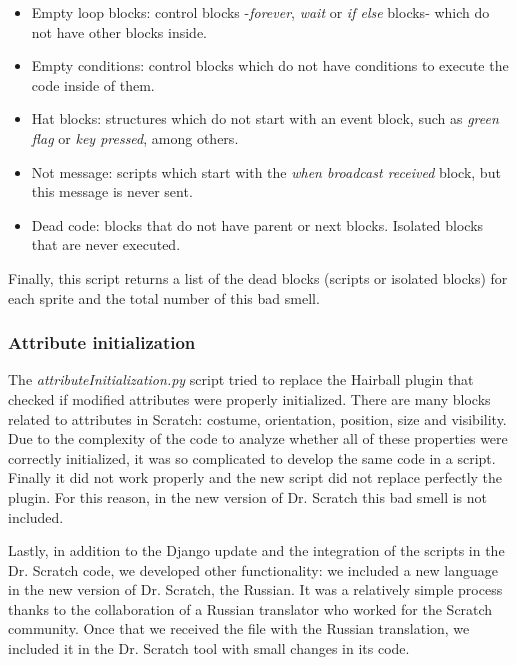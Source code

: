 \begin{itemize}
    \item Empty loop blocks: control blocks -\textit{forever}, \textit{wait} or \textit{if else} blocks- which do not have other blocks inside. 
    \item Empty conditions: control blocks which do not have conditions to execute the code inside of them.
    \item Hat blocks: structures which do not start with an event block, such as \textit{green flag} or \textit{key pressed}, among others.
    \item Not message: scripts which start with the \textit{when broadcast received} block, but this message is never sent. 
    \item Dead code: blocks that do not have parent or next blocks. Isolated blocks that are never executed.
\end{itemize}

Finally, this script returns a list of the dead blocks (scripts or isolated blocks) for each sprite and the total number of this bad smell.

\subsubsection{Attribute initialization}
\label{subsubsec:att_initialization}

The \textit{attributeInitialization.py} script tried to replace the Hairball plugin that checked if modified attributes were properly initialized. There are many blocks related to attributes in Scratch: costume, orientation, position, size and visibility. Due to the complexity of the code to analyze whether all of these properties were correctly initialized, it was so complicated to develop the same code in a script. Finally it did not work properly and the new script did not replace perfectly the plugin. For this reason, in the new version of Dr. Scratch this bad smell is not included.

\hfill

Lastly, in addition to the Django update and the integration of the scripts in the Dr. Scratch code, we developed other functionality: we included a new language in the new version of Dr. Scratch, the Russian. It was a relatively simple process thanks to the collaboration of a Russian translator who worked for the Scratch community. Once that we received the file with the Russian translation, we included it in the Dr. Scratch tool with small changes in its code.


